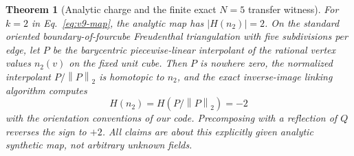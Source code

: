 \documentclass[aps,prd,onecolumn,notitlepage,11pt,superscriptaddress,longbibliography]{revtex4-2}
\newtheorem{theorem}{Theorem}
\newcommand{\norm}[1]{\left\lVert#1\right\rVert}
\begin{document}
\begin{theorem}[Analytic charge and the finite exact $N=5$ transfer witness]\label{th:v9transfer}
For $k=2$ in Eq.~\eqref{eq:v9-map}, the analytic map has $|H(n_2)|=2$. On the standard oriented boundary-of-fourcube Freudenthal triangulation with five subdivisions per edge, let $P$ be the barycentric piecewise-linear interpolant of the rational vertex values $n_2(v)$ on the fixed unit cube. Then $P$ is nowhere zero, the normalized interpolant $P/\norm P_2$ is homotopic to $n_2$, and the exact inverse-image linking algorithm computes
\begin{equation}\label{eq:v9integer}
 H(n_2)=H(P/\norm P_2)=-2
\end{equation}
with the orientation conventions of our code. Precomposing with a reflection of $Q$ reverses the sign to $+2$. All claims are about this explicitly given analytic synthetic map, not arbitrary unknown fields.
\end{theorem}
\end{document}
